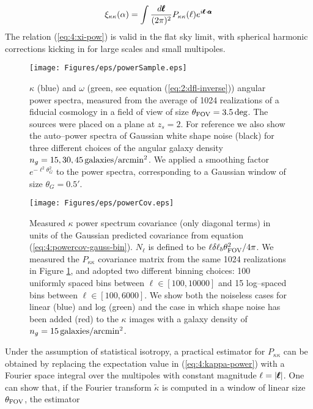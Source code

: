 \begin{equation}
\label{eq:4:xi-pow}
\xi_{\kappa\kappa}(\alpha) = \int \frac{d\pmb{\ell}}{(2\pi)^2}P_{\kappa\kappa}(\ell)e^{i\pmb{\ell}\cdot\pmb{\alpha}}
\end{equation}
%
The relation (\ref{eq:4:xi-pow}) is valid in the flat sky limit, with spherical harmonic corrections kicking in for large scales and small multipoles.
%
\begin{figure}
\begin{center}
\texttt{[image: Figures/eps/powerSample.eps]}
\end{center}
\caption{$\kappa$ (blue) and $\omega$ (green, see equation (\ref{eq:2:dfl-inverse})) angular power spectra, measured from the average of 1024 realizations of a fiducial cosmology in a field of view of size $\theta_{\rm FOV}=3.5\,{\rm deg}$. The sources were placed on a plane at $z_s=2$. For reference we also show the auto--power spectra of Gaussian white shape noise (black) for three different choices of the angular galaxy density $n_g=15,30,45\,{\rm galaxies}/{\rm arcmin}^2$. We applied a smoothing factor $e^{-\ell^2\theta_G^2}$ to the power spectra, corresponding to a Gaussian window of size $\theta_G=0.5'$.}
\label{fig:4:psample}
\end{figure}
%
\begin{figure}
\begin{center}
\texttt{[image: Figures/eps/powerCov.eps]}
\end{center}
\caption{Measured $\kappa$ power spectrum covariance (only diagonal terms) in units of the Gaussian predicted covariance from equation (\ref{eq:4:powercov-gauss-bin}). $N_\ell$ is defined to be $\ell\delta\ell_b\theta_{\rm FOV}^2/4\pi$. We measured the $P_{\kappa\kappa}$ covariance matrix from the same 1024 realizations in Figure \ref{fig:4:psample}, and adopted two different binning choices: 100 uniformly spaced bins between $\ell\in[100,10000]$ and 15 log--spaced bins between $\ell\in[100,6000]$. We show both the noiseless cases for linear (blue) and log (green) and the case in which shape noise has been added (red) to the $\kappa$ images with a galaxy density of $n_g=15\,{\rm galaxies}/{\rm arcmin}^2$.}
\label{fig:4:pcov}
\end{figure}
%
Under the assumption of statistical isotropy, a practical estimator for $P_{\kappa\kappa}$ can be obtained by replacing the expectation value in (\ref{eq:4:kappa-power}) with a Fourier space integral over the multipoles with constant magnitude $\ell=\vert\pmb{\ell}\vert$. One can show that, if the Fourier transform $\tilde{\kappa}$ is computed in a window of linear size $\theta_{\rm FOV}$, the estimator

